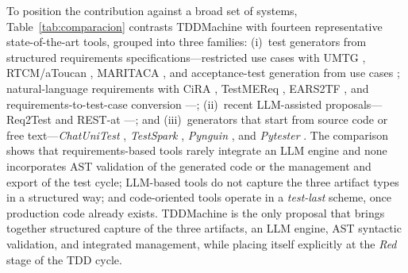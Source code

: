 \documentclass[10pt,journal,twoside,letterpaper]{IEEEtran}
\begin{document}
    To position the contribution against a broad set of systems, Table~\ref{tab:comparacion} contrasts TDDMachine with fourteen representative state-of-the-art tools, grouped into three families: (i)~test generators from structured requirements specifications---restricted use cases with UMTG \cite{Wang2015Umtg}, RTCM/aToucan \cite{Yue2015Rtcm}, MARITACA \cite{Erazo2017Maritaca}, and acceptance-test generation from use cases \cite{Wang2022Automatic}; natural-language requirements with CiRA \cite{Frattini2023Cira}, TestMEReq \cite{Moketar2016Testmereq}, EARS2TF \cite{Liu2022Ears2tf}, and requirements-to-test-case conversion \cite{Gupta2019Software}---; (ii)~recent LLM-assisted proposals---Req2Test \cite{Franca2026Req2test} and REST-at \cite{LeonQuinstedt2026Rest}---; and (iii)~generators that start from source code or free text---\emph{ChatUniTest} \cite{chen2024chatunitest}, \emph{TestSpark} \cite{sapozhnikov2024testspark}, \emph{Pynguin} \cite{lukasczyk2022pynguin}, and \emph{Pytester} \cite{takerngsaksiri2025pytester}. The comparison shows that requirements-based tools rarely integrate an LLM engine and none incorporates AST validation of the generated code or the management and export of the test cycle; LLM-based tools do not capture the three artifact types in a structured way; and code-oriented tools operate in a \emph{test-last} scheme, once production code already exists. TDDMachine is the only proposal that brings together structured capture of the three artifacts, an LLM engine, AST syntactic validation, and integrated management, while placing itself explicitly at the \emph{Red} stage of the TDD cycle.
    
\end{document}

